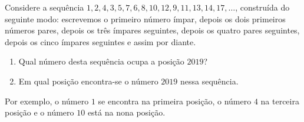 Considere a sequência $1, 2, 4, 3, 5, 7, 6, 8, 10, 12, 9, 11, 13, 14, 17, \dots$, construída do seguinte modo: escrevemos o primeiro número ímpar, depois os dois primeiros números pares, depois os três ímpares seguintes, depois os quatro pares seguintes, depois os cinco ímpares seguintes e assim por diante.

\begin{enumerate}[label = (\alph*)]
	\item Qual número desta sequência ocupa a posição $2019$?
	\item Em qual posição encontra-se o número $2019$ nessa sequência.
\end{enumerate}

\begin{rem}
	Por exemplo, o número $1$ se encontra na primeira posição, o número $4$ na terceira posição e o número $10$ está na nona posição.
\end{rem}
